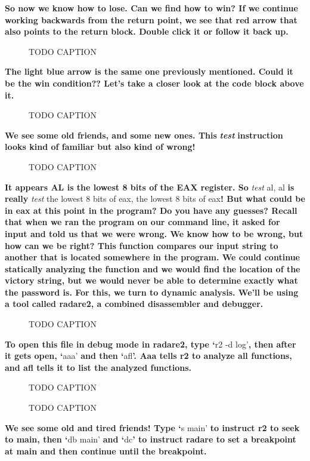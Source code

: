 \documentclass[letterpaper]{article}
\newcommand{\sitfig}[3]{
\begin{figure}[H]
\centering
\makebox[\textwidth][c]{
#2
}
\caption{#3}
\label{#1}
\end{figure}
}
\newcommand{\sitgfx}[4][scale=1.0]{
\sitfig{#3}{\texttt{[image: \#2]}}{#4}
}
\begin{document}
\textbf{So now we know how to lose. Can we find how to win? If we continue working backwards from the return point, we
see that red arrow that also points to the return block. Double click it or follow it back up.}

{\centering   
\sitgfx[width=3.1146in,height=4.4272in]{FINALWORKINGDOCFORMERLYPRECURSOR-img019.png}{fig:unk}{TODO CAPTION}
 \par}
\textbf{The light blue arrow is the same one previously mentioned. Could it be the win condition?? Let's take a closer
look at the code block above it.}

{\centering   
\sitgfx[width=4.6354in,height=1.5in]{FINALWORKINGDOCFORMERLYPRECURSOR-img020.png}{fig:unk}{TODO CAPTION}
\par}
\textbf{We see some old friends, and some new ones. This }\textbf{\textit{test}}\textbf{ instruction looks kind of
familiar but also kind of wrong! }  
\sitgfx[width=6.5in,height=4.8752in]{FINALWORKINGDOCFORMERLYPRECURSOR-img021.png}{fig:unk}{TODO CAPTION}
 

\textbf{It appears AL is the lowest 8 bits of the EAX register. So }\textit{test} al, al\textbf{ is really
}\textit{test} the lowest 8 bits of eax, the lowest 8 bits of eax\textbf{! But what could be in eax at this point in
the program? Do you have any guesses? Recall that when we ran the program on our command line, it asked for input and
told us that we were wrong. We know how to be wrong, but how can we be right? This function compares our input string
to another that is located somewhere in the program. We could continue statically analyzing the function and we would
find the location of the victory string, but we would never be able to determine exactly what the password is. For
this, we turn to dynamic analysis. We'll be using a tool called radare2, a combined disassembler and debugger. } 

\sitgfx[width=6.5in,height=4.3335in]{FINALWORKINGDOCFORMERLYPRECURSOR-img022.png}{fig:unk}{TODO CAPTION}
 \textbf{To open this file in debug mode in radare2, type `}r2 -d log'\textbf{, then after it gets open, `}aaa'\textbf{
and then `}afl\textbf{{}'. Aaa tells r2 to analyze all functions, and afl tells it to list the analyzed functions.}

  
\sitgfx[width=6.5in,height=4.1807in]{FINALWORKINGDOCFORMERLYPRECURSOR-img023.png}{fig:unk}{TODO CAPTION}
 

  
\sitgfx[width=6.5in,height=4.9028in]{FINALWORKINGDOCFORMERLYPRECURSOR-img024.png}{fig:unk}{TODO CAPTION}
 \textbf{\newline
We see some old and tired friends! Type `}s main' \textbf{to instruct r2 to seek to main, then `}db main' \textbf{and
`}dc\textbf{{}' to instruct radare to set a breakpoint at main and then continue until the breakpoint.}
\end{document}
